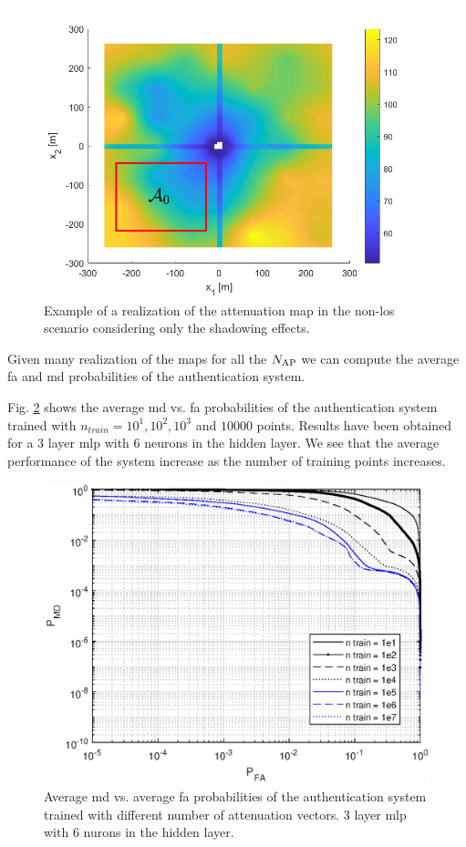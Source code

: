 \documentclass[twocolumns]{IEEEtran}
\begin{document}
\begin{figure}[t]
    \centering
    \includegraphics[width=1\columnwidth]{surfColorato.png}
    \caption{Example of a realization of the attenuation map in the non-\ac{los} scenario considering only the shadowing effects.}
    \label{fig:trueMap}
\end{figure}

Given many realization of the maps for all the $N_{\rm AP}$ we can compute the average \ac{fa} and \ac{md} probabilities of the authentication system.

Fig. \ref{fig:n_train} shows the average \ac{md} vs. \ac{fa} probabilities of the authentication system trained with $n_{train} = 10^1, 10^2, 10^3$ and $10000$ points. Results have been obtained for a $3$ layer \ac{mlp} with $6$ neurons in the hidden layer. We see that the average performance of the system increase as the number of training points increases.

\begin{figure}[t]
    \centering
    \includegraphics[width=1\columnwidth]{mean_maps.eps}
    \caption{Average \ac{md} vs. average \ac{fa} probabilities of the authentication system trained with different number of attenuation vectors. $3$ layer \ac{mlp} with $6$ nurons in the hidden layer.}
    \label{fig:n_train}
\end{figure}
\end{document}
